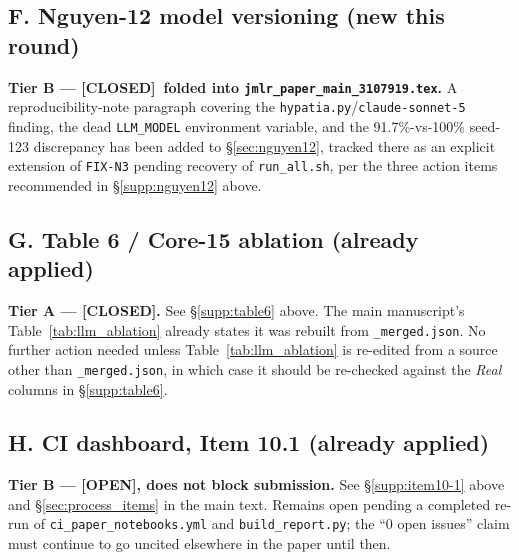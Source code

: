 \documentclass[11pt]{article}
\newcommand{\open}{\textcolor{red!60!black}{\textbf{[OPEN]}}}
\newcommand{\closed}{\textcolor{green!40!black}{\textbf{[CLOSED]}}}
\begin{document}
\subsection*{F. Nguyen-12 model versioning (new this round)}

\textbf{Tier B --- \closed\ folded into
\texttt{jmlr\_paper\_main\_3107919.tex}.} A reproducibility-note paragraph
covering the \texttt{hypatia.py}/\texttt{claude-sonnet-5} finding, the dead
\texttt{LLM\_MODEL} environment variable, and the 91.7\%-vs-100\%
seed-123 discrepancy has been added to \S\ref{sec:nguyen12}, tracked
there as an explicit extension of \texttt{FIX-N3} pending recovery of
\texttt{run\_all.sh}, per the three action items recommended in
\S\ref{supp:nguyen12} above.

\subsection*{G. Table 6 / Core-15 ablation (already applied)}

\textbf{Tier A --- \closed.} See \S\ref{supp:table6} above. The main
manuscript's Table~\ref{tab:llm_ablation} already states it was rebuilt
from \texttt{\_merged.json}. No further action needed unless
Table~\ref{tab:llm_ablation} is re-edited from a source other than
\texttt{\_merged.json}, in which case it should be re-checked against the
\emph{Real} columns in \S\ref{supp:table6}.

\subsection*{H. CI dashboard, Item 10.1 (already applied)}

\textbf{Tier B --- \open, does not block submission.} See
\S\ref{supp:item10-1} above and \S\ref{sec:process_items} in the main
text. Remains open pending a completed re-run of
\texttt{ci\_paper\_notebooks.yml} and \texttt{build\_report.py}; the
``0 open issues'' claim must continue to go uncited elsewhere in the
paper until then.
\end{document}
